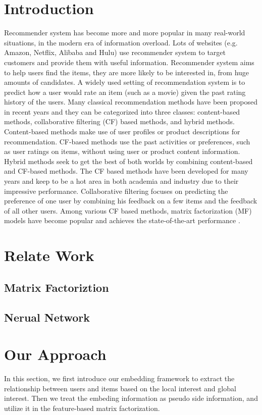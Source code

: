 \documentclass{sig-alternate-05-2015}
\begin{document}
\section{Introduction}
Recommender system has become more and more popular in many real-world situations, in the modern era of information overload.
Lots of websites (e.g. Amazon, Netflix, Alibaba and Hulu) use recommender system to target customers and provide them with useful information.
Recommender system aims to help users find the items, they are more likely to be interested in, from huge amounts of candidates.
A widely used setting of recommendation system is to predict how a user would rate an item (such as a movie) given the past rating history of the users.
Many classical recommendation methods have been proposed in recent years and they can be categorized into three classes:
content-based methods, collaborative filtering (CF) based methods, and hybrid methods.
Content-based methods \cite{pazzani2007content} make use of user profiles or product descriptions for recommendation.
CF-based methods \cite{su2009survey} use the past activities or preferences, such as user ratings on items, without using user or product content information.
Hybrid methods \cite{wang2011collaborative} seek to get the best of both worlds by combining content-based and CF-based methods.
The CF based methods have been developed for many years and keep to be a hot area in both academia and industry due to their impressive performance.
Collaborative filtering focuses on predicting the preference of one user by combining his feedback on a few items and the feedback of all other users.
Among various CF based methods, matrix factorization (MF) models have become popular and achieves the state-of-the-art performance \cite{koren2009matrix}.

\section{Relate Work}
\subsection{Matrix Factoriztion}
\subsection{Nerual Network}

\section{Our Approach}
In this section,
we first introduce our embedding framework to extract the relationship
between users and items based on the local interest and global interest.
Then we treat the embeding information as pseudo side information,
and utilize it in the feature-based matrix factorization.
\end{document}
